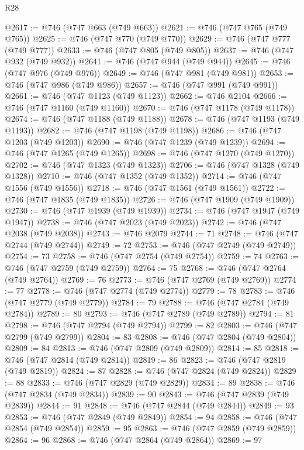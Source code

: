 \begin{lexlean}{R28}
\begin{coremodule}
@2617 := @746 (@747 @663 (@749 @663))
@2621 := @746 (@747 @765 (@749 @765))
@2625 := @746 (@747 @770 (@749 @770))
@2629 := @746 (@747 @777 (@749 @777))
@2633 := @746 (@747 @805 (@749 @805))
@2637 := @746 (@747 @932 (@749 @932))
@2641 := @746 (@747 @944 (@749 @944))
@2645 := @746 (@747 @976 (@749 @976))
@2649 := @746 (@747 @981 (@749 @981))
@2653 := @746 (@747 @986 (@749 @986))
@2657 := @746 (@747 @991 (@749 @991))
@2661 := @746 (@747 @1123 (@749 @1123))
@2662 := @746 @2104
@2666 := @746 (@747 @1160 (@749 @1160))
@2670 := @746 (@747 @1178 (@749 @1178))
@2674 := @746 (@747 @1188 (@749 @1188))
@2678 := @746 (@747 @1193 (@749 @1193))
@2682 := @746 (@747 @1198 (@749 @1198))
@2686 := @746 (@747 @1203 (@749 @1203))
@2690 := @746 (@747 @1239 (@749 @1239))
@2694 := @746 (@747 @1265 (@749 @1265))
@2698 := @746 (@747 @1270 (@749 @1270))
@2702 := @746 (@747 @1323 (@749 @1323))
@2706 := @746 (@747 @1328 (@749 @1328))
@2710 := @746 (@747 @1352 (@749 @1352))
@2714 := @746 (@747 @1556 (@749 @1556))
@2718 := @746 (@747 @1561 (@749 @1561))
@2722 := @746 (@747 @1835 (@749 @1835))
@2726 := @746 (@747 @1909 (@749 @1909))
@2730 := @746 (@747 @1939 (@749 @1939))
@2734 := @746 (@747 @1947 (@749 @1947))
@2738 := @746 (@747 @2023 (@749 @2023))
@2742 := @746 (@747 @2038 (@749 @2038))
@2743 := @746 @2079
@2744 := 71
@2748 := @746 (@747 @2744 (@749 @2744))
@2749 := 72
@2753 := @746 (@747 @2749 (@749 @2749))
@2754 := 73
@2758 := @746 (@747 @2754 (@749 @2754))
@2759 := 74
@2763 := @746 (@747 @2759 (@749 @2759))
@2764 := 75
@2768 := @746 (@747 @2764 (@749 @2764))
@2769 := 76
@2773 := @746 (@747 @2769 (@749 @2769))
@2774 := 77
@2778 := @746 (@747 @2774 (@749 @2774))
@2779 := 78
@2783 := @746 (@747 @2779 (@749 @2779))
@2784 := 79
@2788 := @746 (@747 @2784 (@749 @2784))
@2789 := 80
@2793 := @746 (@747 @2789 (@749 @2789))
@2794 := 81
@2798 := @746 (@747 @2794 (@749 @2794))
@2799 := 82
@2803 := @746 (@747 @2799 (@749 @2799))
@2804 := 83
@2808 := @746 (@747 @2804 (@749 @2804))
@2809 := 84
@2813 := @746 (@747 @2809 (@749 @2809))
@2814 := 85
@2818 := @746 (@747 @2814 (@749 @2814))
@2819 := 86
@2823 := @746 (@747 @2819 (@749 @2819))
@2824 := 87
@2828 := @746 (@747 @2824 (@749 @2824))
@2829 := 88
@2833 := @746 (@747 @2829 (@749 @2829))
@2834 := 89
@2838 := @746 (@747 @2834 (@749 @2834))
@2839 := 90
@2843 := @746 (@747 @2839 (@749 @2839))
@2844 := 91
@2848 := @746 (@747 @2844 (@749 @2844))
@2849 := 93
@2853 := @746 (@747 @2849 (@749 @2849))
@2854 := 94
@2858 := @746 (@747 @2854 (@749 @2854))
@2859 := 95
@2863 := @746 (@747 @2859 (@749 @2859))
@2864 := 96
@2868 := @746 (@747 @2864 (@749 @2864))
@2869 := 97

\end{coremodule}
\end{lexlean}
